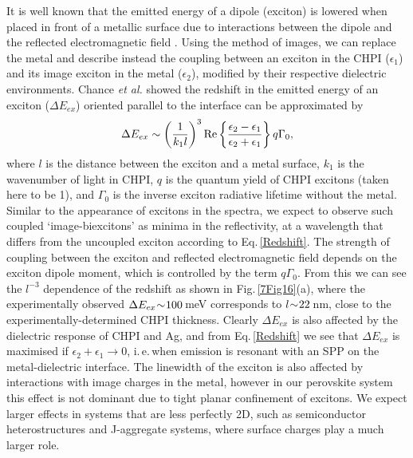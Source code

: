 It is well known that the emitted energy of a dipole (exciton) is lowered when placed in front of a metallic surface due to interactions between the dipole and the reflected electromagnetic field \cite{Morawitz1969, Morawitz1974, Chance1974, Chance1975, Chance1975a, Ford1984}. Using the method of images, we can replace the metal and describe instead the coupling between an exciton in the CHPI ($\epsilon_1$) and its image exciton in the metal ($\epsilon_2$), modified by their respective dielectric environments. Chance \textit{et al.} \cite{Chance1975} showed the redshift in the emitted energy of an exciton ($\Delta E_{ex}$) oriented parallel to the interface can be approximated by
\begin{equation}
\centering
\Delta E_{ex} \sim \left( \frac{1}{k_1 l} \right) ^3 \text{Re} \left\{ \frac{\epsilon_2 - \epsilon_1}{\epsilon_2 + \epsilon_1} \right\} q \Gamma_0 ,
\label{Redshift}
\end{equation}
where $l$ is the distance between the exciton and a metal surface, $k_1$ is the wavenumber of light in CHPI, $q$ is the quantum yield of CHPI excitons (taken here to be 1), and $\Gamma_0$ is the inverse exciton radiative lifetime without the metal. Similar to the appearance of excitons in the spectra, we expect to observe such coupled `image-biexcitons' as minima in the reflectivity, at a wavelength that differs from the uncoupled exciton according to Eq.\,\ref{Redshift}. The strength of coupling between the exciton and reflected electromagnetic field depends on the exciton dipole moment, which is controlled by the term $q \Gamma_0$. From this we can see the $l^{-3}$ dependence of the redshift as shown in Fig.\,\ref{7Fig16}(a), where the experimentally observed $\Delta E_{ex} \negmedspace \sim \negmedspace 100$\,meV corresponds to $l \negmedspace \sim \negmedspace 22$\,nm, close to the experimentally-determined CHPI thickness. Clearly $\Delta E_{ex}$ is also affected by the dielectric response of CHPI and Ag, and from Eq.\,\ref{Redshift} we see that $\Delta E_{ex}$ is maximised if $\epsilon_2 + \epsilon_1 \rightarrow 0$, i.\,e.\,when emission is resonant with an SPP on the metal-dielectric interface. The linewidth of %
the exciton is also affected by interactions with image charges in the metal, however in our perovskite system this effect is not dominant due to tight planar confinement of excitons. We expect larger effects in systems that are less perfectly 2D, such as semiconductor heterostructures and J-aggregate systems, where surface charges play a much larger role.

